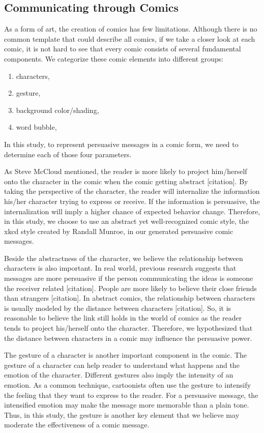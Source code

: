 \subsection{Communicating through Comics}
As a form of art, the creation of comics has few limitations. Although there is no common template that could describe all comics, if we take a closer look at each comic, it is not hard to see that every comic consists of several fundamental components. We categorize these comic elements into different groups:
\begin{enumerate}
 \item	characters,
 \item gesture,
 \item	background color/shading,
 \item	word bubble,
\end{enumerate}\par
In this study, to represent persuasive messages in a comic form, we need to determine each of those four parameters.\par
As Steve McCloud mentioned, the reader is more likely to project him/herself onto the character in the comic when the comic getting abstract [citation]. By taking the perspective of the character, the reader will internalize the information his/her character trying to express or receive. If the information is persuasive, the internalization will imply a higher chance of expected behavior change. Therefore, in this study, we choose to use an abstract yet well-recognized comic style, the xkcd style created by Randall Munroe, in our generated persuasive comic messages.\par
Beside the abstractness of the character, we believe the relationship between characters is also important. In real world, previous research suggests that messages are more persuasive if the person communicating the ideas is someone the receiver related [citation]. People are more likely to believe their close friends than strangers [citation]. In abstract comics, the relationship between characters is usually modeled by the distance between characters [citation]. So, it is reasonable to believe the link still holds in the world of comics as the reader tends to project his/herself onto the character. Therefore, we hypothesized that the distance between characters in a comic may influence the persuasive power.\par
The gesture of a character is another important component in the comic. The gesture of a character can help reader to understand what happens and the emotion of the character. Different gestures also imply the intensity of an emotion. As a common technique, cartoonists often use the gesture to intensify the feeling that they want to express to the reader. For a persuasive message, the intensified emotion may make the message more memorable than a plain tone. Thus, in this study, the gesture is another key element that we believe may moderate the effectiveness of a comic message.\par
